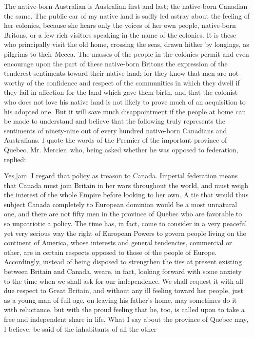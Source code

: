 \documentclass[11pt,openany]{book}
\begin{document}
The native-born Australian is Australian first and last; the native-born Canadian the same. The public ear of my native land is sadly led astray about the feeling of her colonies, because she hears only the voices of her own people, native-born Britons, or a few rich visitors speaking in the name of the colonies. It is these who principally visit the old home, crossing the seas, drawn hither by longings, as pilgrims to their Mecca. The masses of the people in the colonies permit and even encourage upon the part of these native-born Britons the expression of the tenderest sentiments toward their native land; for they know that men are not worthy of the confidence and respect of the communities in which they dwell if they fail in affection for the land which gave them birth, and that the colonist who does not love his native land is not likely to prove much of an acquisition to his adopted one. But it will save much disappointment if the people at home can be made to understand and believe that the following truly represents the sentiments of ninety-nine out of every hundred native-born Canadians and Australians. I quote the words of the Premier of the important province of Quebec, Mr. Mercier, who, being asked whether he was opposed to federation, replied:

Yes,[am. I regard that policy as treason to Canada. Imperial federation means that Canada must join Britain in her wars throughout the world, and must weigh the interest of the whole Empire before looking to her own. A tie that would thus subject Canada completely to European dominion would be a most unnatural one, and there are not fifty men in the province of Quebec who are favorable to so unpatriotic a policy. The time has, in fact, come to consider in a very peaceful yet very serious way the right of European Powers to govern people living on the continent of America, whose interests and general tendencies, commercial or other, are in certain respects opposed to those of the people of Europe. Accordingly, instead of being disposed to strengthen the ties at present existing between Britain and Canada, weare, in fact, looking forward with some anxiety to the time when we shall ask for our independence. We shall request it with all due respect to Great Britain, and without any ill feeling toward her people, just as a young man of full age, on leaving his father's home, may sometimes do it with reluctance, but with the proud feeling that he, too, is called upon to take a free and independent share in life. What I say about the province of Quebec may, I believe, be said of the inhabitants of all the other
\end{document}
